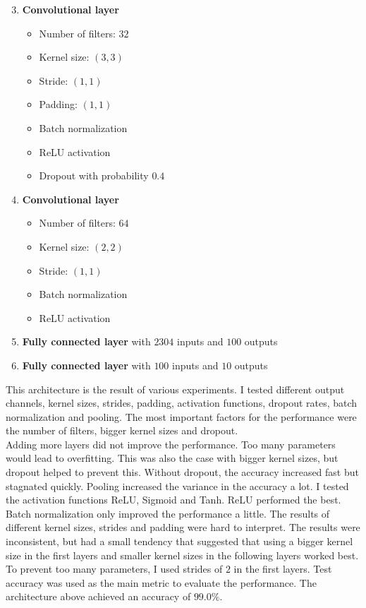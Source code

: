 \begin{minipage}[t]{0.48\linewidth}
  \begin{enumerate}
    \setcounter{enumi}{2}
    \item \textbf{Convolutional layer}
          \begin{itemize}
            \item Number of filters: $32$
            \item Kernel size: $(3, 3)$
            \item Stride: $(1, 1)$
            \item Padding: $(1, 1)$
            \item Batch normalization
            \item ReLU activation
            \item Dropout with probability $0.4$
          \end{itemize}
    \item \textbf{Convolutional layer}
          \begin{itemize}
            \item Number of filters: $64$
            \item Kernel size: $(2, 2)$
            \item Stride: $(1, 1)$
            \item Batch normalization
            \item ReLU activation
          \end{itemize}
    \item \textbf{Fully connected layer} with $2304$ inputs and $100$ outputs
    \item \textbf{Fully connected layer} with $100$ inputs and $10$ outputs
  \end{enumerate}
\end{minipage}
\vspace*{0.3cm}

This architecture is the result of various experiments. I tested different output channels, kernel
sizes, strides, padding, activation functions, dropout rates, batch normalization and pooling. The
most important factors for the performance were the number of filters, bigger kernel sizes and
dropout.\\
Adding more layers did not improve the performance. Too many parameters would lead to overfitting.
This was also the case with bigger kernel sizes, but dropout helped to prevent this. Without
dropout, the accuracy increased fast but stagnated quickly. Pooling increased the variance in the
accuracy a lot. I tested the activation functions ReLU, Sigmoid and Tanh. ReLU performed the best.
Batch normalization only improved the performance a little. The results of different kernel sizes,
strides and padding were hard to interpret. The results were inconsistent, but had a small tendency
that suggested that using a bigger kernel size in the first layers and smaller kernel sizes in the
following layers worked best. To prevent too many parameters, I used strides of $2$ in the first
layers. Test accuracy was used as the main metric to evaluate the performance. The architecture
above achieved an accuracy of $99.0\%$.


